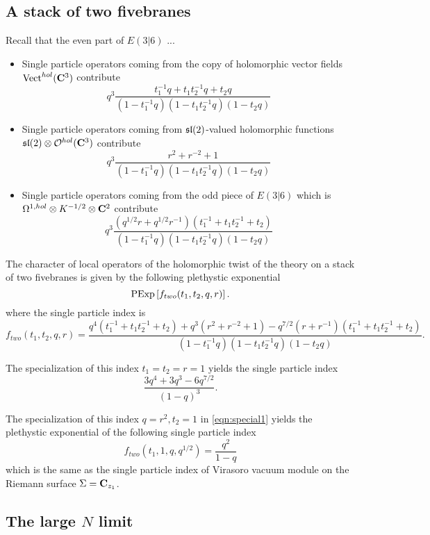 \subsection{A stack of two fivebranes}

\parsec[]

Recall that the even part of $E(3|6)$ ... 

\begin{itemize}
\item Single particle operators coming from the copy of holomorphic vector fields $\operatorname{Vect}^{hol}(\mathbf{C}^3)$ contribute
\[
q^3 \frac{t_1^{-1} q + t_1 t_2^{-1} q + t_2 q }{(1-t_1^{-1}q) (1-t_1 t_2^{-1} q) (1-t_2 q)} 
\]
\item Single particle operators coming from $\mathfrak{sl}(2)$-valued holomorphic functions $\mathfrak{sl}(2) \otimes \mathcal O^{hol}(\mathbf{C}^3)$ contribute
\[
q^3\frac{r^2 + r^{-2} + 1}{(1-t_1^{-1}q) (1-t_1 t_2^{-1} q) (1-t_2 q)} 
\]
\item Single particle operators coming from the odd piece of $E(3|6)$ which is $\Omega^{1,hol} \otimes K^{-1/2} \otimes \mathbf{C}^2$ contribute
\[
q^{3}\frac{(q^{1/2} r + q^{1/2} r^{-1})(t_1^{-1} + t_1t_2^{-1} + t_2)}{(1-t_1^{-1}q) (1-t_1 t_2^{-1} q) (1-t_2 q)}
\]
\end{itemize}

\begin{conj}
The character of local operators of the holomorphic twist of the theory on a stack of two fivebranes is given by the following plethystic exponential
\[
{\rm PExp} \left[f_{two} (t_1,t_2,q,r) \right] .
\]
where the single particle index is
\[
f_{two} (t_1,t_2,q,r) = \frac{q^4(t_1^{-1} + t_1 t_2^{-1}  + t_2) + q^3 (r^2 + r^{-2} + 1) - q^{7/2} (r + r^{-1})(t_1^{-1} + t_1t_2^{-1} + t_2)}{(1-t_1^{-1}q) (1-t_1 t_2^{-1} q) (1-t_2 q)} .
\]
\end{conj}

\parsec[]

The specialization of this index $t_1=t_2=r=1$ yields the single particle index
\[
\frac{3q^4 + 3 q^3 - 6 q^{7/2}}{(1-q)^3}. 
\]

\parsec[]

The specialization of this index $q=r^2, t_2=1$ in \eqref{eqn:special1} yields the plethystic exponential of the following single particle index
\[
f_{two}(t_1, 1, q, q^{1/2}) = \frac{q^2}{1-q} 
\]
which is the same as the single particle index of Virasoro vacuum module on the Riemann surface $\Sigma = \mathbf{C}_{z_1}$. 

\subsection{The large $N$ limit}

